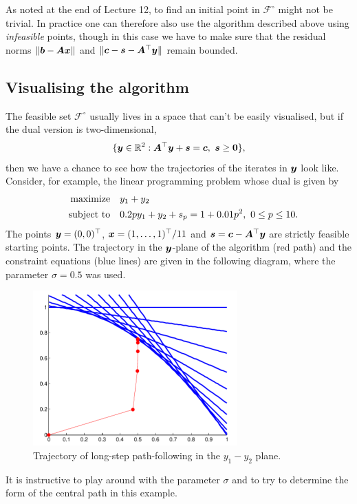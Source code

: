 \begin{remark}
 As noted at the end of Lecture 12, to find an initial point in $\mathcal{F}^{\circ}$ might not be trivial. In practice one can therefore also use the algorithm described above using {\em infeasible} points, though in this case we have to make sure that the residual norms $\Vert {\bm{b}-\bm{A}\bm{x}}\Vert$ and $\Vert {\bm{c}-\bm{s}-\bm{A}^{\top}\bm{y}}\Vert$ remain bounded.
\end{remark}

\subsection{Visualising the algorithm}
The feasible set $\mathcal{F}^{\circ}$ usually lives in a space that can't be easily visualised, but if the dual version is two-dimensional,
\begin{equation*}
 \{\bm{y}\in \mathbb{R}^2 \mathrel{\mathop{:}} \bm{A}^{\top}\bm{y}+\bm{s}=\bm{c}, \ \bm{s}\geq \bm{0}\},
\end{equation*}
then we have a chance to see how the trajectories of the iterates in $\bm{y}$ look like.
Consider, for example, the linear programming problem whose dual is given by
\begin{align*}
\text{maximize}\quad & y_1+y_2\\
\quad\text{subject to}\quad & 0.2py_1+y_2+s_p = 1+0.01p^2, \ 0\leq p\leq 10.
\end{align*}
The points $\bm{y}=(0,0)^{\top}$, $\bm{x}=(1,\dots,1)^{\top}/11$ and $\bm{s}=\bm{c}-\bm{A}^{\top}\bm{y}$ are strictly feasible starting points. The trajectory in the $\bm{y}$-plane of the algorithm (red path) and the constraint equations (blue lines) are given in the following diagram, where the parameter $\sigma=0.5$ was used.
\begin{figure}[h!]
\centering
 \includegraphics[width=0.7\textwidth]{images/lect12_cropped.pdf}
 \caption{Trajectory of long-step path-following in the $y_1-y_2$ plane.}\label{fig:fig1}
\end{figure}
It is instructive to play around with the parameter $\sigma$ and to try to determine the form of the central path in this example.

